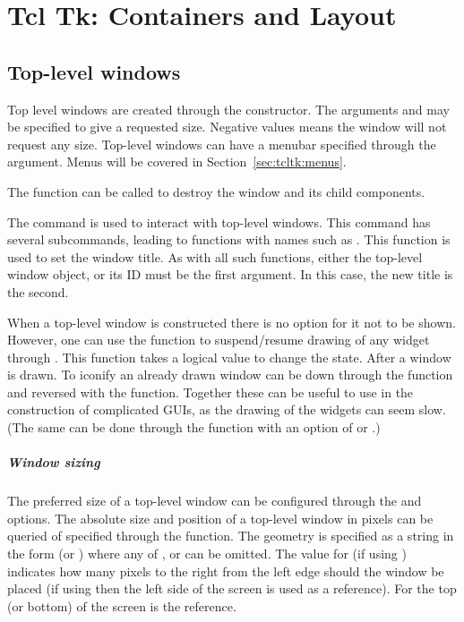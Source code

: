 \chapter{Tcl Tk: Containers and Layout}
\label{sec:tcltk:basic-containers}

\section{Top-level windows}
\label{sec:top-level-windows}

Top level windows are created through the 
constructor. The arguments  and  may be
specified to give a requested size. Negative values means the window
will not request any size. Top-level windows can have a menubar specified through the  argument. Menus will be covered
in Section~\ref{sec:tcltk:menus}.

The  function can be called to destroy the window
and its child components.

The \TK\/ command  is used to interact with top-level
windows. This command has several subcommands, leading to 
functions with names such as . This function is
used to set the window title. As with all such functions, either the
top-level window object, or its ID must be the first argument. In this
case, the new title is the second.

When a top-level window is constructed there is no option for it not
to be shown.  However, one can use the 
function to suspend/resume drawing of any widget through \TK. This
function takes a logical value to change the state. After a window is
drawn. To iconify an already drawn window can be down through the
 function and reversed with the
 function. Together these can be useful to
use in the construction of complicated GUIs, as the drawing of the
widgets can seem slow. (The same can be done through the
 function with an option of  or
.)
 
\paragraph{Window sizing}
The preferred size of a top-level window can be configured through the  and  options. The absolute size and position of a top-level window in pixels can be queried of specified through the 
function. The geometry is specified as a string in the form  (or \code{-}) where any of \code{=},  or  can be omitted. The value for  (if using \code{+})
indicates how many pixels to the right from the left edge should the window be
placed (if using \code{-} then the left side of the screen is used as
a reference). For  the top (or bottom) of the screen is the reference.

